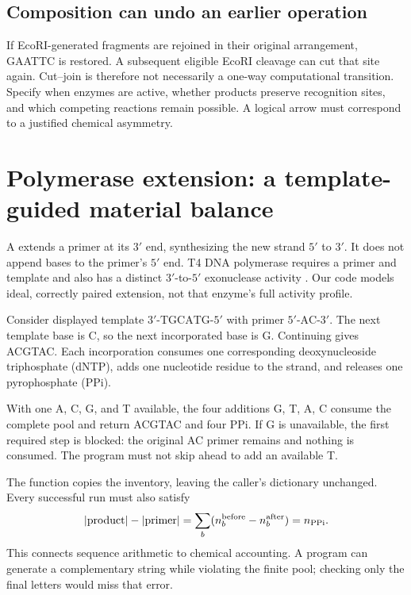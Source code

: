 \subsection{Composition can undo an earlier operation}

If EcoRI-generated fragments are rejoined in their original arrangement, GAATTC is restored. A subsequent eligible EcoRI cleavage can cut that site again. Cut--join is therefore not necessarily a one-way computational transition. Specify when enzymes are active, whether products preserve recognition sites, and which competing reactions remain possible. A logical arrow must correspond to a justified chemical asymmetry.

\section{Polymerase extension: a template-guided material balance}

A  extends a primer at its $3'$ end, synthesizing the new strand $5'$ to $3'$. It does not append bases to the primer's $5'$ end. T4 DNA polymerase requires a primer and template and also has a distinct $3'$-to-$5'$ exonuclease activity \cite{NEBT4Pol}. Our code models ideal, correctly paired extension, not that enzyme's full activity profile.

Consider displayed template $3'\text{-TGCATG-}5'$ with primer $5'\text{-AC-}3'$. The next template base is C, so the next incorporated base is G. Continuing gives ACGTAC. Each incorporation consumes one corresponding deoxynucleoside triphosphate (dNTP), adds one nucleotide residue to the strand, and releases one pyrophosphate (PPi).



With one A, C, G, and T available, the four additions G, T, A, C consume the complete pool and return ACGTAC and four PPi. If G is unavailable, the first required step is blocked: the original AC primer remains and nothing is consumed. The program must not skip ahead to add an available T.

The function copies the inventory, leaving the caller's dictionary unchanged. Every successful run must also satisfy
\begin{equation}
|{\rm product}|-|{\rm primer}|
=\sum_b(n_b^{\rm before}-n_b^{\rm after})=n_{\rm PPi}.
\label{eq:extensionbalance}
\end{equation}
This connects sequence arithmetic to chemical accounting. A program can generate a complementary string while violating the finite pool; checking only the final letters would miss that error.

